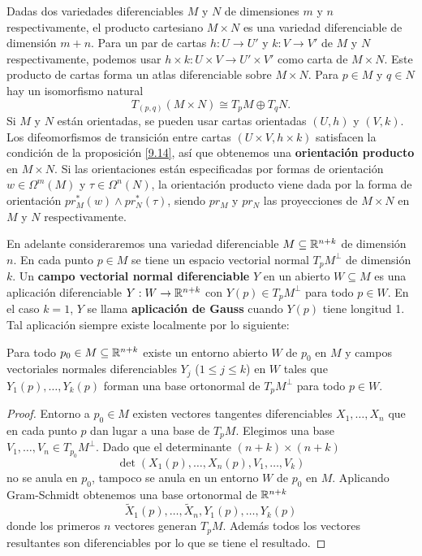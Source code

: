 \documentclass[CV.tex]{subfiles}
\begin{document}
\begin{nota}
Dadas dos variedades diferenciables $M$ y $N$ de dimensiones $m$ y $n$ respectivamente, el producto cartesiano $M\times N$ es una variedad diferenciable de dimensión $m+n$. Para un par de cartas $h:U\to U'$ y $k:V\to V'$ de $M$ y $N$ respectivamente, podemos usar $h\times k:U\times V\to U'\times V'$ como carta de $M\times N$. Este producto de cartas forma un atlas diferenciable sobre $M\times N$. Para $p\in M$ y $q\in N$ hay un isomorfismo natural
\[
T_{(p,q)}(M\times N)\cong T_pM\oplus T_qN.
\]
Si $M$ y $N$ están orientadas, se pueden usar cartas orientadas $(U,h)$ y $(V,k)$. Los difeomorfismos de transición entre cartas $(U\times V, h\times k)$ satisfacen la condición de la proposición \ref{9.14}, así que obtenemos una \textbf{orientación producto} en $M\times N$. Si las orientaciones están especificadas por formas de orientación $w\in\Omega^m(M)$ y $\tau\in\Omega^n(N)$, la orientación producto viene dada por la forma de orientación $pr^*_M(w)\land pr^*_N(\tau)$, siendo $pr_M$ y $pr_N$ las proyecciones de $M\times N$ en $M$ y $N$ respectivamente. 
\end{nota}

En adelante consideraremos una variedad diferenciable $M\subseteq\mathbb{R}^{n+k}$ de dimensión $n$. En cada punto $p\in M$ se tiene un espacio vectorial normal $T_pM^{\perp}$ de dimensión $k$. Un \textbf{campo vectorial normal diferenciable} $Y$ en un abierto $W\subseteq M$ es una aplicación diferenciable $Y:W\to\mathbb{R}^{n+k}$ con $Y(p)\in T_pM^{\perp}$ para todo $p\in W$. En el caso $k=1$, $Y$ se llama \textbf{aplicación de Gauss} cuando $Y(p)$ tiene longitud 1. Tal aplicación siempre existe localmente por lo siguiente:

\begin{lemma}
Para todo $p_0\in M\subseteq\mathbb{R}^{n+k}$ existe un entorno abierto $W$ de $p_0$ en $M$ y campos vectoriales normales diferenciables $Y_j$ ($1\leq j\leq k$) en $W$ tales que $Y_1(p),\dots, Y_k(p)$ forman una base ortonormal de $T_pM^{\perp}$ para todo $p\in W$.
\end{lemma}
\begin{proof}
Entorno a $p_0\in M$ existen vectores tangentes diferenciables $X_1,\dots, X_n$ que en cada punto $p$ dan lugar a una base de $T_pM$. Elegimos una base $V_1,\dots, V_n\in T_{p_0}M^{\perp}$. Dado que el determinante $(n+k)\times(n+k)$
\[
\det(X_1(p),\dots, X_n(p),V_1,\dots, V_k)
\]
no se anula en $p_0$, tampoco se anula en un entorno $W$ de $p_0$ en $M$. Aplicando Gram-Schmidt obtenemos una base ortonormal de $\mathbb{R}^{n+k}$
\[
\widetilde{X}_1(p),\dots, \widetilde{X}_n, Y_1(p),\dots, Y_k(p)
\]
donde los primeros $n$ vectores generan $T_pM$. Además todos los vectores resultantes son diferenciables por lo que se tiene el resultado.
\end{proof}
\end{document}

